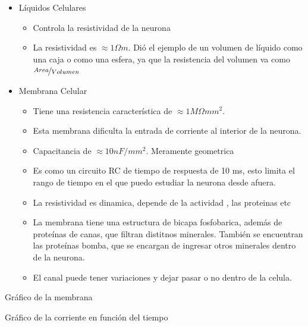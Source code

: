 \begin{itemize}
	\item Líquidos Celulares
		\begin{itemize}
			\item Controla la resistividad de la neurona
			\item La resistividad es $\approx 1 \Omega m$. Dió el ejemplo de un volumen de líquido como  una caja o como una esfera, ya que la resistencia del volumen va como $\nicefrac{Area}{Volumen}$
			\end{itemize}
	\item Membrana Celular
		\begin{itemize}
			\item Tiene una resistencia característica de $\approx 1 M\Omega mm^2$. 
			\item Esta membrana dificulta la entrada de corriente al interior de la neurona. 
			\item Capacitancia de $\approx 10 nF/mm^2$. Meramente geometrica
			\item Es como un circuito RC de tiempo de respuesta de 10 ms, esto limita el rango de tiempo en el que puedo estudiar la neurona desde afuera.
			\item La resistividad es dinamica, depende de la actividad , las proteinas etc
			\item La membrana tiene una estructura de bicapa fosfobarica, además de proteínas de canas, que filtran distitnos minerales. También se encuentran las proteínas bomba, que se encargan de ingresar otros minerales dentro de la neurona.
			\item El canal puede tener variaciones y dejar pasar o no dentro de la celula.
		\end{itemize}
\end{itemize}

Gráfico de la membrana

Gráfico de la corriente en función del tiempo


